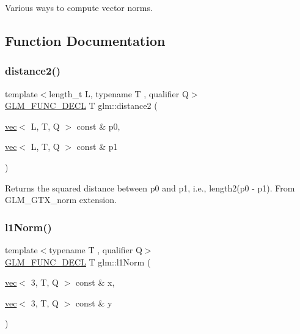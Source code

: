 Various ways to compute vector norms. 

\subsection{Function Documentation}
\mbox{\label{group__gtx__norm_ga85660f1b79f66c09c7b5a6f80e68c89f}} 
\subsubsection{\texorpdfstring{distance2()}{distance2()}}
{\footnotesize\ttfamily template$<$length\+\_\+t L, typename T , qualifier Q$>$ \\
\mbox{\hyperlink{setup_8hpp_ab2d052de21a70539923e9bcbf6e83a51}{G\+L\+M\+\_\+\+F\+U\+N\+C\+\_\+\+D\+E\+CL}} T glm\+::distance2 (\begin{DoxyParamCaption}\item[{\mbox{\hyperlink{structglm_1_1vec}{vec}}$<$ L, T, Q $>$ const \&}]{p0,  }\item[{\mbox{\hyperlink{structglm_1_1vec}{vec}}$<$ L, T, Q $>$ const \&}]{p1 }\end{DoxyParamCaption})}

Returns the squared distance between p0 and p1, i.\+e., length2(p0 -\/ p1). From G\+L\+M\+\_\+\+G\+T\+X\+\_\+norm extension. \mbox{\label{group__gtx__norm_gae2fc0b2aa967bebfd6a244700bff6997}} 
\subsubsection{\texorpdfstring{l1\+Norm()}{l1Norm()}\hspace{0.1cm}{\footnotesize\ttfamily [1/2]}}
{\footnotesize\ttfamily template$<$typename T , qualifier Q$>$ \\
\mbox{\hyperlink{setup_8hpp_ab2d052de21a70539923e9bcbf6e83a51}{G\+L\+M\+\_\+\+F\+U\+N\+C\+\_\+\+D\+E\+CL}} T glm\+::l1\+Norm (\begin{DoxyParamCaption}\item[{\mbox{\hyperlink{structglm_1_1vec}{vec}}$<$ 3, T, Q $>$ const \&}]{x,  }\item[{\mbox{\hyperlink{structglm_1_1vec}{vec}}$<$ 3, T, Q $>$ const \&}]{y }\end{DoxyParamCaption})}

